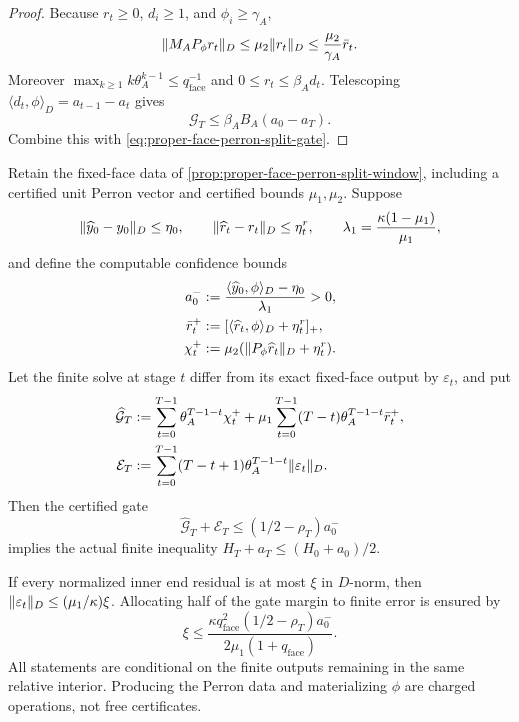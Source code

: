 \documentclass[11pt]{article}
\begin{document}
\begin{proof}
Because $r_t\geq0$, $d_i\geq1$, and $\phi_i\geq\gamma_A$,
\begin{equation*}
 \lVert M_AP_\phi r_t\rVert_D
 \leq\mu_2\lVert r_t\rVert_D
 \leq\frac{\mu_2}{\gamma_A}\bar r_t.
\end{equation*}
Moreover
$\max_{k\geq1}k\theta_A^{k-1}\leq q_{\mathrm{face}}^{-1}$ and
$0\leq r_t\leq\beta_Ad_t$.  Telescoping
$\langle d_t,\phi\rangle_D=a_{t-1}-a_t$ gives
\begin{equation*}
 \mathcal G_T
 \leq\beta_AB_A(a_0-a_T).
\end{equation*}
Combine this with
\cref{eq:proper-face-perron-split-gate}.
\end{proof}

\begin{corollary}
\label{cor:proper-face-finite-perron-gate}
Retain the fixed-face data of
\cref{prop:proper-face-perron-split-window}, including a certified unit
Perron vector and certified bounds $\mu_1,\mu_2$.  Suppose
\begin{equation*}
 \lVert\widehat y_0-y_0\rVert_D\leq\eta_0,
 \qquad
 \lVert\widehat r_t-r_t\rVert_D\leq\eta_t^r,
 \qquad
 \lambda_1=\frac{\kappa(1-\mu_1)}{\mu_1},
\end{equation*}
and define the computable confidence bounds
\begin{align*}
 a_0^-&:=\frac{\langle\widehat y_0,\phi\rangle_D-\eta_0}{\lambda_1}>0,\\
 \bar r_t^+&:=[\langle\widehat r_t,\phi\rangle_D+\eta_t^r]_+,\\
 \chi_t^+&:=\mu_2
   (\lVert P_\phi\widehat r_t\rVert_D+\eta_t^r).
\end{align*}
Let the finite solve at stage $t$ differ from its exact fixed-face output by
$\varepsilon_t$, and put
\begin{align*}
 \widehat{\mathcal G}_T
 &:={\sum_{t=0}^{T-1}\theta_A^{T-1-t}\chi_t^+}
  +\mu_1\sum_{t=0}^{T-1}(T-t)\theta_A^{T-1-t}\bar r_t^+,\\
 \mathcal E_T
 &:=\sum_{t=0}^{T-1}(T-t+1)\theta_A^{T-1-t}
       \lVert\varepsilon_t\rVert_D.
\end{align*}
Then the certified gate
\begin{equation}
 \widehat{\mathcal G}_T+\mathcal E_T
 \leq(1/2-\rho_T)a_0^-
 \label{eq:proper-face-finite-perron-gate}
\end{equation}
implies the actual finite inequality $H_T+a_T\leq(H_0+a_0)/2$.

If every normalized inner end residual is at most $\xi$ in $D$-norm, then
$\lVert\varepsilon_t\rVert_D\leq(\mu_1/\kappa)\xi$.  Allocating half of the gate
margin to finite error is ensured by
\begin{equation}
 \xi\leq
 \frac{\kappa q_{\mathrm{face}}^2(1/2-\rho_T)a_0^-}
      {2\mu_1(1+q_{\mathrm{face}})}.
 \label{eq:proper-face-finite-perron-inner-budget}
\end{equation}
All statements are conditional on the finite outputs remaining in the same
relative interior.  Producing the Perron data and materializing $\phi$ are
charged operations, not free certificates.
\end{corollary}
\end{document}
